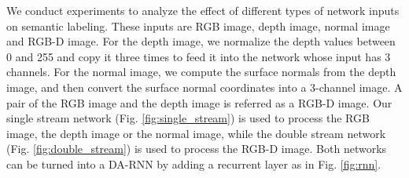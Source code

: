 \documentclass[conference]{IEEEtran}
\begin{document}
\begin{table*} 
\end{table*}

We conduct experiments to analyze the effect of different types of network inputs on semantic labeling. These inputs are RGB image, depth image, normal image and RGB-D image. For the depth image, we normalize the depth values between 0 and 255 and copy it three times to feed it into the network whose input has 3 channels. For the normal image, we compute the surface normals from the  depth image, and then convert the surface normal coordinates into a 3-channel image. A pair of the RGB image and the depth image is referred as a RGB-D image. Our single stream network (Fig. \ref{fig:single_stream}) is used to process the RGB image, the depth image or the normal image, while the double stream network (Fig. \ref{fig:double_stream}) is used to process the RGB-D image. Both networks can be turned into a DA-RNN by adding a recurrent layer as in Fig. \ref{fig:rnn}.
\end{document}
